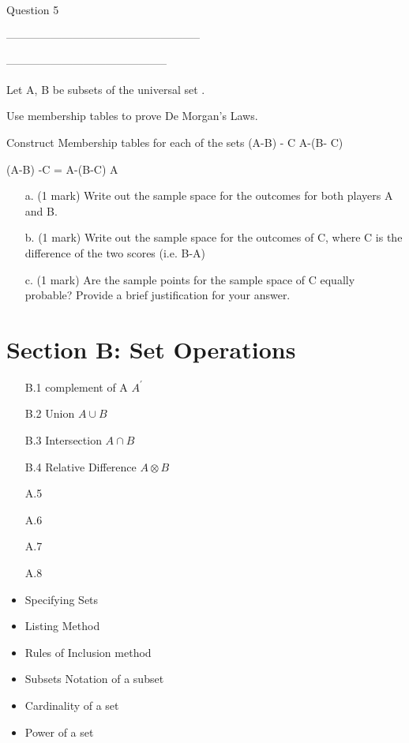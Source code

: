 Question 5

-----------------------------------------------------


--------------------------------------------

Let A, B be subsets of the universal set .

Use membership tables to prove De Morgan's Laws.



Construct Membership tables for each of the sets
(A-B) - C
A-(B- C)

(A-B) -C = A-(B-C)
A



\begin{itemize}
\item[a.] (1 mark) Write out the sample space for the outcomes for both players A and B.
\item[b.] (1 mark) Write out the sample space for the outcomes of C, where C is the difference of the two scores (i.e. B-A)
\item[c.] (1 mark) Are the sample points for the sample space of C equally probable? Provide a brief justification for your answer.
\end{itemize}

\newpage
\section*{Section B: Set Operations}
\begin{itemize}
\item[B.1] complement of A $A^{\prime}$
\item[B.2] Union $A \cup B$
\item[B.3] Intersection $A \cap B$
\item[B.4] Relative Difference $A \otimes B$
\item[A.5]
\item[A.6]
\item[A.7]
\item[A.8]
\end{itemize}
\newpage


\begin{itemize}
\item Specifying Sets
\item Listing Method
\item Rules of Inclusion method
\end{itemize}


\begin{itemize}
\item Subsets Notation of a subset
\item Cardinality of a set
\item Power of a set
\end{itemize}

